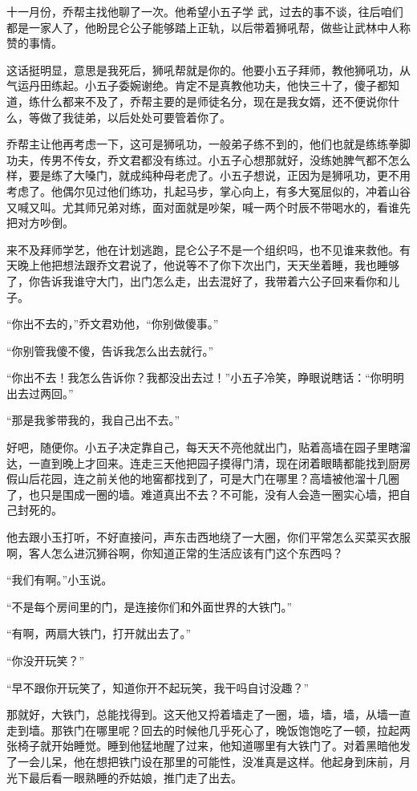 十一月份，乔帮主找他聊了一次。他希望小五子学
武，过去的事不谈，往后咱们都是一家人了，他盼昆仑公子能够踏上正轨，以后带着狮吼帮，做些让武林中人称赞的事情。

这话挺明显，意思是我死后，狮吼帮就是你的。他要小五子拜师，教他狮吼功，从气运丹田练起。小五子委婉谢绝。肯定不是真教他功夫，他快三十了，傻子都知道，练什么都来不及了，乔帮主要的是师徒名分，现在是我女婿，还不便说你什么，等做了我徒弟，以后处处可要管着你了。

乔帮主让他再考虑一下，这可是狮吼功，一般弟子练不到的，他们也就是练练拳脚功夫，传男不传女，乔文君都没有练过。小五子心想那就好，没练她脾气都不怎么样，要是练了大嗓门，就成纯种母老虎了。小五子想说，正因为是狮吼功，更不用考虑了。他偶尔见过他们练功，扎起马步，掌心向上，有多大冤屈似的，冲着山谷又喊又叫。尤其师兄弟对练，面对面就是吵架，喊一两个时辰不带喝水的，看谁先把对方吵倒。

来不及拜师学艺，他在计划逃跑，昆仑公子不是一个组织吗，也不见谁来救他。有天晚上他把想法跟乔文君说了，他说等不了你下次出门，天天坐着睡，我也睡够了，你告诉我谁守大门，出门怎么走，出去混好了，我带着六公子回来看你和儿子。

“你出不去的，”乔文君劝他，“你别做傻事。”

“你别管我傻不傻，告诉我怎么出去就行。”

“你出不去！我怎么告诉你？我都没出去过！”小五子冷笑，睁眼说瞎话：“你明明出去过两回。”

“那是我爹带我的，我自己出不去。”

好吧，随便你。小五子决定靠自己，每天天不亮他就出门，贴着高墙在园子里瞎溜达，一直到晚上才回来。连走三天他把园子摸得门清，现在闭着眼睛都能找到厨房假山后花园，连之前关他的地窖都找到了，可是大门在哪里？高墙被他溜十几圈了，也只是围成一圈的墙。难道真出不去？不可能，没有人会造一圈实心墙，把自己封死的。

他去跟小玉打听，不好直接问，声东击西地绕了一大圈，你们平常怎么买菜买衣服啊，客人怎么进沉狮谷啊，你知道正常的生活应该有门这个东西吗？

“我们有啊。”小玉说。

“不是每个房间里的门，是连接你们和外面世界的大铁门。”

“有啊，两扇大铁门，打开就出去了。”

“你没开玩笑？”

“早不跟你开玩笑了，知道你开不起玩笑，我干吗自讨没趣？”

那就好，大铁门，总能找得到。这天他又捋着墙走了一圈，墙，墙，墙，从墙一直走到墙。那铁门在哪里呢？回去的时候他几乎死心了，晚饭饱饱吃了一顿，拉起两张椅子就开始睡觉。睡到他猛地醒了过来，他知道哪里有大铁门了。对着黑暗他发了一会儿呆，他在想把铁门设在那里的可能性，没准真是这样。他起身到床前，月光下最后看一眼熟睡的乔姑娘，推门走了出去。

